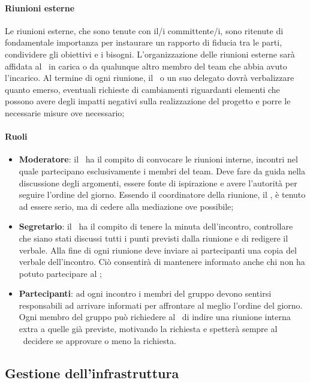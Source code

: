 \documentclass[../NormeDiProgetto_v3.0.0.tex]{subfiles}
\begin{document}
			\paragraph{Riunioni esterne}
				Le riunioni esterne, che sono tenute con il/i committente/i, sono ritenute di fondamentale importanza per instaurare un rapporto di fiducia tra le parti, condividere gli obiettivi e i bisogni.
				L'organizzazione delle riunioni esterne sarà affidata al \responsabilediprogetto\ in carica o da qualunque altro membro del team che abbia avuto l'incarico.
				Al termine di ogni riunione, il \responsabilediprogetto\ o un suo delegato dovrà verbalizzare quanto emerso, eventuali richieste di cambiamenti riguardanti elementi che possono avere degli impatti negativi sulla realizzazione del progetto e porre le necessarie misure ove necessario;
					\paragraph{Ruoli}
						\begin{itemize}
							\item \textbf{Moderatore}: il \responsabilediprogetto\ ha il compito di convocare le riunioni interne, incontri nel quale partecipano esclusivamente i membri del team. Deve fare da guida nella discussione degli argomenti, essere fonte di ispirazione e avere l'autorità per seguire l'ordine del giorno.
				Essendo il coordinatore della riunione, il \responsabilediprogetto, è tenuto ad essere serio, ma di cedere alla mediazione ove possibile;
							\item \textbf{Segretario}: il \segretario\ ha il compito di tenere la minuta dell'incontro, controllare che siano stati discussi tutti i punti previsti dalla riunione e di redigere il verbale. Alla fine di ogni riunione deve inviare ai partecipanti una copia del verbale dell'incontro. Ciò consentirà di mantenere informato anche chi non ha potuto partecipare al ;
							\item \textbf{Partecipanti}: ad ogni incontro i membri del gruppo devono sentirsi responsabili ad arrivare informati per affrontare al meglio l'ordine del giorno.
				Ogni membro del gruppo può richiedere al \responsabilediprogetto\ di indire una riunione interna extra a quelle già previste, motivando la richiesta e spetterà sempre al \responsabilediprogetto\ decidere se approvare o meno la richiesta.
				\end{itemize}
	
	\subsection{Gestione dell'infrastruttura}
\end{document}
